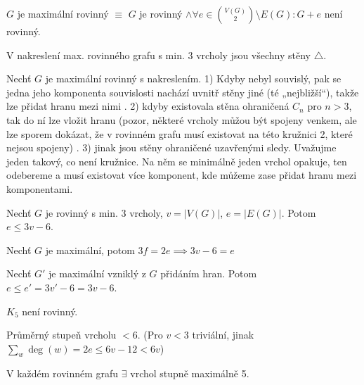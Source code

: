 \documentclass[12pt]{article}					%
\begin{document}
        \begin{definice}
            $G$ je maximální rovinný $≡$ $G$ je rovinný $\land \forall e \in \binom{V(G)}{2} \setminus E(G): G+e$ není rovinný.
        \end{definice}

        \begin{veta}
            V nakreslení max. rovinného grafu s min. 3 vrcholy jsou všechny stěny $\triangle$.
            \begin{dukazin}
                Nechť $G$ je maximální rovinný s nakreslením. 1) Kdyby nebyl souvislý, pak se jedna jeho komponenta souvislosti nachází uvnitř stěny jiné (té „nejbližší“), takže lze přidat hranu mezi nimi \lightning. 2) kdyby existovala stěna ohraničená $C_n$ pro $n>3$, tak do ní lze vložit hranu (pozor, některé vrcholy můžou být spojeny venkem, ale lze sporem dokázat, že v rovinném grafu musí existovat na této kružnici 2, které nejsou spojeny) \lightning. 3) jinak jsou stěny ohraničené uzavřenými sledy. Uvažujme jeden takový, co není kružnice. Na něm se minimálně jeden vrchol opakuje, ten odebereme a musí existovat více komponent, kde můžeme zase přidat hranu mezi komponentami.
            \end{dukazin}
        \end{veta}

        \begin{veta}
            Nechť $G$ je rovinný s min. 3 vrcholy, $v = |V(G)|$, $e=|E(G)|$. Potom $e ≤ 3v - 6$.
            \begin{dukazin}
                Nechť $G$ je maximální, potom $3f=2e \implies 3v-6=e$

                Nechť $G'$  je maximální vzniklý z $G$ přidáním hran. Potom $e ≤ e'=3v'-6=3v-6$.
            \end{dukazin}
        \end{veta}

        \begin{dusledek}[Znovu]
            $K_5$ není rovinný.
        \end{dusledek}

        \begin{dusledek}
            Průměrný stupeň vrcholu $< 6$. (Pro $v<3$ triviální, jinak $\sum_w \deg(w) = 2e ≤ 6v - 12 < 6v$)
        \end{dusledek}

        \begin{dusledek}
            V každém rovinném grafu $\exists$ vrchol stupně maximálně 5.
        \end{dusledek}
\end{document}

